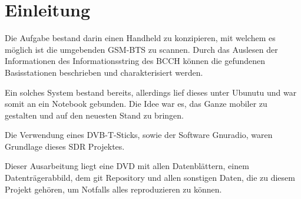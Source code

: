 %
%
\chapter{Einleitung}

Die Aufgabe bestand darin einen Handheld zu konzipieren, mit welchem es möglich ist die umgebenden GSM-\ac{BTS} zu scannen. Durch das Auslesen der Informationen des Informationsstring des \ac{BCCH} können die gefundenen Basisstationen beschrieben und charakterisiert werden.

Ein solches System bestand bereits, allerdings lief dieses unter Ubunutu und war somit an ein Notebook gebunden. Die Idee war es, das Ganze mobiler zu gestalten und auf den neuesten Stand zu bringen. 

Die Verwendung eines \ac{DVB}-T-Sticks, sowie der Software Gnuradio, waren Grundlage dieses \ac{SDR} Projektes.

Dieser Ausarbeitung liegt eine DVD mit allen Datenblättern, einem Datenträgerabbild, dem git Repository und allen sonstigen Daten, die zu diesem Projekt gehören, um Notfalls alles reproduzieren zu können. 

